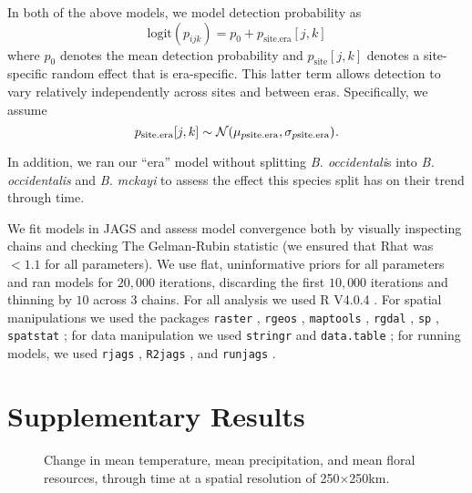 \documentclass[12pt]{article}
\begin{document}
In both of the above models, we model detection probability as
\begin{equation}
\label{eq:paired-back-logit-det}
\text{logit}(p_{ijk})= p_0 + p_{\mathrm{site.era}}[j,k]
\end{equation}
where $p_0$ denotes the mean detection probability and $p_{\mathrm{site}}[j,k]$ denotes a site-specific random effect that is era-specific. This latter term allows detection to vary relatively independently across sites and between eras. Specifically, we assume
\begin{equation}
    p_{\mathrm{site.era}}[j,k] \sim \mathcal{N}(\mu_{p\mathrm{site.era}}, \sigma_{p\mathrm{site.era}})\hspace{0.1ex}.
\end{equation}

In addition, we ran our ``era'' model without splitting \textit{B. occidentali}s into \textit{B. occidentalis} and \textit{B. mckayi} to assess the effect this species split has on their trend through time. 

We fit models in JAGS \citep{plummer-2003-jags} and assess model convergence both by visually inspecting chains and checking The Gelman-Rubin statistic (we ensured that Rhat was $< 1.1$ for all parameters). We use flat, uninformative priors for all parameters and ran models for $20,000$ iterations, discarding the first $10,000$ iterations and thinning by $10$ across $3$ chains. For all analysis we used R V4.0.4 \citep{R-program}. For spatial manipulations we used the packages \texttt{raster} \citep{raster-package}, \texttt{rgeos} \citep{rgeos-package}, \texttt{maptools} \citep{maptools-package}, \texttt{rgdal} \citep{rgdal-package}, 
\texttt{sp} \citep{sp-package}, \texttt{spatstat} \citep{spatstat-package}; for data manipulation we used \texttt{stringr} \citep{stringr-package} and \texttt{data.table} \citep{data.table-package}; for running models, we used \texttt{rjags} \citep{rjags-package}, \texttt{R2jags} \citep{R2jags}, and \texttt{runjags} \citep{runjags-package}.


\section{Supplementary Results}

\clearpage



\begin{landscape}
\begin{figure}[ht]
  \begin{center}
  \end{center}
  \caption{Change in mean temperature, mean precipitation, and mean floral resources, through time at a spatial resolution of 250$\times$250km.}
  \label{fig:env-variables-time-250}
\end{figure}
\end{landscape}
\clearpage
\end{document}
